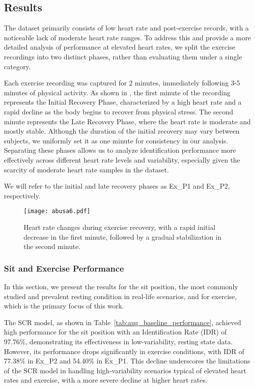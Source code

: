 \subsection{Results}
The dataset primarily consists of low heart rate and post-exercise records, with a noticeable lack of moderate heart rate ranges.
To address this and provide a more detailed analysis of performance at elevated heart rates, we split the exercise recordings into two distinct phases, rather than evaluating them under a single category.

Each exercise recording was captured for 2 minutes, immediately following 3-5 minutes of physical activity.
As shown in , the first minute of the recording represents the Initial Recovery Phase, characterized by a high heart rate and a rapid decline as the body begins to recover from physical stress. The second minute represents the Late Recovery Phase, where the heart rate is moderate and mostly stable. Although the duration of the initial recovery may vary between subjects, we uniformly set it as one minute for consistency in our analysis.
Separating these phases allows us to analyze identification performance more effectively across different heart rate levels and variability, especially given the scarcity of moderate heart rate samples in the dataset.

We will refer to the initial and late recovery phases as Ex\_P1 and Ex\_P2, respectively.

\begin{figure}[!t]
\centering
\texttt{[image: abusa6.pdf]}
\caption{Heart rate changes during exercise recovery, with a rapid initial decrease in the first minute, followed by a gradual stabilization in the second minute.}
\label{fig:hr_change}
\end{figure}

\subsubsection{Sit and Exercise Performance}
\label{chap:sit_ex_results}
In this section, we present the results for the sit position, the most commonly studied and prevalent resting condition in real-life scenarios, and for exercise, which is the primary focus of this work.

The SCR model, as shown in Table~\ref{tab:aug_baseline_performance}, achieved high performance for the sit position with an Identification Rate (IDR) of 97.76\%, demonstrating its effectiveness in low-variability, resting state data.
However, its performance drops significantly in exercise conditions, with IDR of 77.38\% in Ex\_P2 and 54.40\% in Ex\_P1.
This decline underscores the limitations of the SCR model in handling high-variability scenarios typical of elevated heart rates and exercise, with a more severe decline at higher heart rates.

